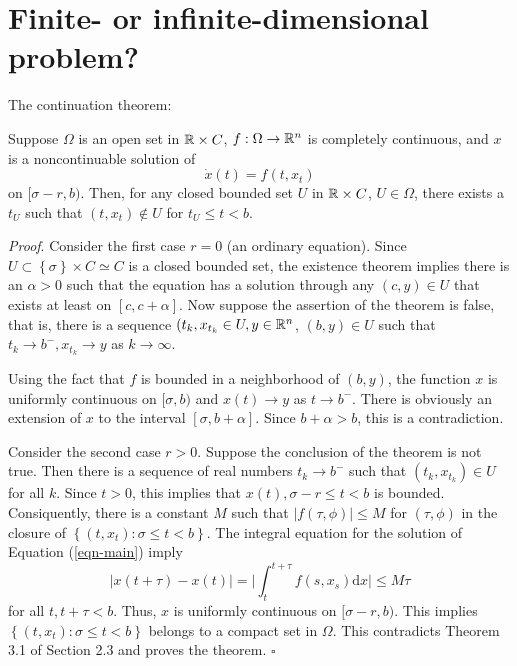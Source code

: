 \section{Finite- or infinite-dimensional problem?}
\begin{frame}[t]
  The continuation theorem:
  \begin{theorem}
    Suppose $\Omega$ is an open set in $\mathbb{R}\times C$, $f:\Omega\to \mathbb{R}^{n}$ is completely continuous, and $x$ is a noncontinuable solution of 
    \begin{equation}\label{eqn-main}
       \dot{x}(t)=f(t,x_t)
    \end{equation}
    on $[\sigma-r,b)$. Then, for any closed bounded set $U$ in $\mathbb{R}\times C$, $U \in \Omega$, there exists a $t_{U}$ such that $(t,x_t)\notin U$ for $t_{U}\le t<b$.
  \end{theorem}
  {\noindent \itshape Proof}.
  Consider the first case $r=0$ (an ordinary equation). Since  $U\subset  \left\{\sigma\right\} \times C\simeq C$ is a closed bounded set, the existence theorem implies there is an $\alpha>0$ such that the equation has a solution through any $(c,y)\in U$ that exists at least on $[c,c+\alpha]$.  Now suppose the assertion of the theorem is false, that is, there is a sequence $(t_k,x_{t_k} \in U,y \in \mathbb{R}^{n}$, $(b,y) \in  U$ such that $t_k\to b^{-},x_{t_k}\to y$ as $k\to \infty$.
\end{frame}
\begin{frame}[t]
  Using the fact that $f$ is bounded in a neighborhood of $(b,y)$, the function $x$ is uniformly continuous on $[\sigma,b)$ and $x(t)\to y$ as $t\to b^{-}$. There is obviously an extension of $x$ to the interval $[\sigma,b+\alpha]$. Since $b+\alpha>b$, this is a contradiction. 

  Consider the second case $r>0$. Suppose the conclusion of the theorem is not true. Then there is a sequence of real numbers $t_k\to b^{-}$ such that $(t_k,x_{t_k}) \in U$ for all $k$. Since $t>0$, this implies that $x(t),\sigma-r\le t <b$ is bounded. Consiquently, there is a constant $M$ such that $|f(\tau ,\phi)|\le M$ for $(\tau ,\phi)$ in the closure of $\left\{(t,x_t):\sigma\le t<b\right\} $. The integral equation for the solution of Equation (\ref{eqn-main}) imply
  \[
    |x(t+\tau )-x(t)|=\lvert \int_t ^{t+\tau }f(s,x_s)\mathrm{d}x \rvert \le M\tau 
  \] 
  for all $t,t+\tau <b$. Thus, $x$ is uniformly continuous on $[\sigma-r,b)$. This implies $\left\{(t,x_t):\sigma \le t < b\right\} $ belongs to a compact set in $\Omega$. This contradicts Theorem 3.1 of Section 2.3 and proves the theorem.
  \hfill $\square$ \par
\end{frame}
